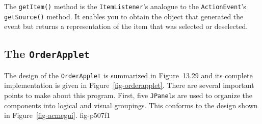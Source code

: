 \noindent The {\tt getItem()} method is the {\tt ItemListener}'s analogue
to the {\tt ActionEvent}'s {\tt getSource()} method. It enables you to obtain
the object that generated the event but returns a representation of
the item that was selected or deselected.

\subsection{The {\tt OrderApplet} }
\noindent The design of the {\tt OrderApplet} is summarized in
Figure~13.29 and its complete implementation is given in
Figure~\ref{fig-orderapplet}. There are several important points to
make about this program. First, five {\tt JPanel}s are used to
organize the components into logical and visual groupings.  This
conforms to the design shown in Figure~\ref{fig-acmegui}.
{fig-p507f1}

